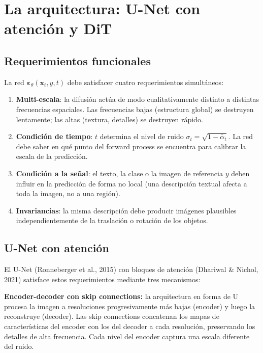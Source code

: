 \section{La arquitectura: U-Net con atención y DiT}
\label{sec:arquitectura_difusion}

\subsection{Requerimientos funcionales}
\label{subsec:arq_requerimientos}

La red $\bm{\varepsilon}_\theta(\bm{x}_t, y, t)$ debe satisfacer cuatro
requerimientos simultáneos:
\begin{enumerate}
  \item \textbf{Multi-escala}: la difusión actúa de modo cualitativamente
        distinto a distintas frecuencias espaciales. Las frecuencias bajas
        (estructura global) se destruyen lentamente; las altas (textura, detalles)
        se destruyen rápido.
  \item \textbf{Condición de tiempo}: $t$ determina el nivel de ruido
        $\sigma_t = \sqrt{1-\bar{\alpha}_t}$. La red debe saber en qué punto
        del forward process se encuentra para calibrar la escala de la
        predicción.
  \item \textbf{Condición a la señal}: el texto, la clase o la imagen de
        referencia $y$ deben influir en la predicción de forma no local
        (una descripción textual afecta a toda la imagen, no a una región).
  \item \textbf{Invariancias}: la misma descripción debe producir imágenes
        plausibles independientemente de la traslación o rotación de los objetos.
\end{enumerate}

\subsection{U-Net con atención}
\label{subsec:unet_atencion}

El U-Net (Ronneberger et al., 2015) con bloques de atención (Dhariwal \& Nichol,
2021) satisface estos requerimientos mediante tres mecanismos:

\textbf{Encoder-decoder con skip connections:} la arquitectura en forma de U
procesa la imagen a resoluciones progresivamente más bajas (encoder) y luego la
reconstruye (decoder). Las skip connections concatenan los mapas de características
del encoder con los del decoder a cada resolución, preservando los detalles de
alta frecuencia. Cada nivel del encoder captura una escala diferente del ruido.

